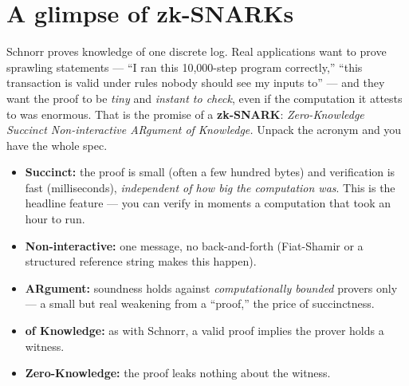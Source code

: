 \section{A glimpse of zk-SNARKs}
\label{ch31:snark}

Schnorr proves knowledge of one discrete log. Real applications want to prove
sprawling statements --- ``I ran this 10,000-step program correctly,'' ``this
transaction is valid under rules nobody should see my inputs to'' --- and they
want the proof to be \emph{tiny} and \emph{instant to check}, even if the
computation it attests to was enormous. That is the promise of a
\textbf{zk-SNARK}: \emph{Zero-Knowledge Succinct Non-interactive ARgument of
Knowledge.} Unpack the acronym and you have the whole spec.

\begin{itemize}
  \item \textbf{Succinct:} the proof is small (often a few hundred bytes) and
  verification is fast (milliseconds), \emph{independent of how big the
  computation was}. This is the headline feature --- you can verify in moments a
  computation that took an hour to run.
  \item \textbf{Non-interactive:} one message, no back-and-forth (Fiat-Shamir or
  a structured reference string makes this happen).
  \item \textbf{ARgument:} soundness holds against \emph{computationally
  bounded} provers only --- a small but real weakening from a ``proof,'' the
  price of succinctness.
  \item \textbf{of Knowledge:} as with Schnorr, a valid proof implies the prover
  holds a witness.
  \item \textbf{Zero-Knowledge:} the proof leaks nothing about the witness.
\end{itemize}

